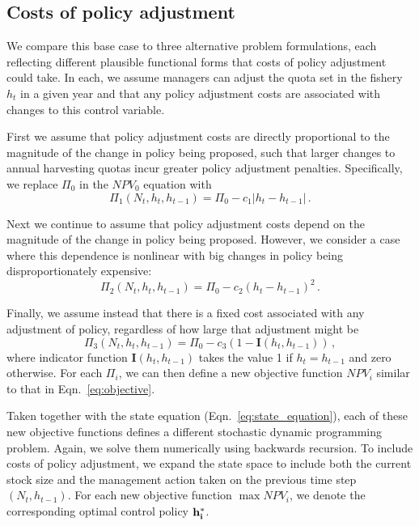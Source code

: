 \documentclass{article}\usepackage{graphicx, color}
\begin{document}
\subsection*{Costs of policy adjustment}
We compare this base case to three alternative problem formulations, each reflecting different plausible functional forms that costs of policy adjustment could take. In each, we assume managers can adjust the quota set in the fishery $h_t$ in a given year and that any policy adjustment costs are associated with changes to this control variable. 

First we assume that policy adjustment costs are directly proportional to the magnitude of the change in policy being proposed, such that larger changes to annual harvesting quotas incur greater policy adjustment penalties. Specifically, we replace $\Pi_0$ in the $NPV_0$ equation with 
\begin{equation}
  \Pi_{1}(N_t,h_t, h_{t-1}) = \Pi_0 - c_1  |  h_t - h_{t-1} | \,.
\end{equation}

Next we continue to assume that policy adjustment costs depend on the magnitude of the change in policy being proposed. However, we consider a case where this dependence is nonlinear with big changes in policy being disproportionately expensive:
\begin{equation}
  \Pi_{2}(N_t,h_t, h_{t-1}) = \Pi_0 - c_2 (  h_t - h_{t-1})^2 \,.
\end{equation}

Finally, we assume instead that there is a fixed cost associated with any adjustment of policy, regardless of how large that adjustment might be
\begin{equation}
  \Pi_{3}(N_t,h_t, h_{t-1}) = \Pi_0 - c_3 (1-\mathbf{I}(h_t, h_{t-1}))  \,,
\end{equation}
where indicator function $\mathbf{I}(h_t, h_{t-1})$ takes the value 1 if $h_t=h_{t-1}$ and zero otherwise. For each $\Pi_i$, we can then define a new objective function $NPV_i$ similar to that in Eqn.~\ref{eq:objective}. 

Taken together with the state equation (Eqn.~\ref{eq:state_equation}), each of these new objective functions defines a different stochastic dynamic programming problem. Again, we solve them numerically using backwards recursion.  To include costs of policy adjustment, we expand the state space to include both the current stock size and the management action taken on the previous time step $(N_t,h_{t-1})$. For each new objective function $\max NPV_i$, we denote the corresponding optimal control policy $ {\bf h_i^*} $.
\end{document}
